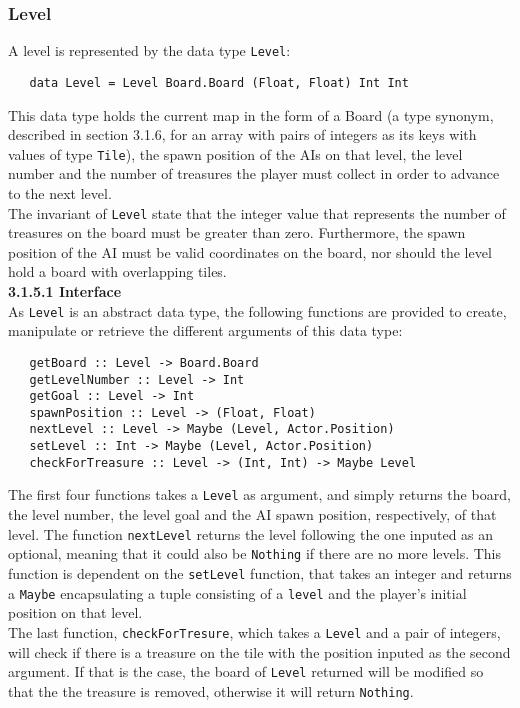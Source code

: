 \documentclass{article}
\begin{document}
        \subsubsection{Level}
        A level is represented by the data type \texttt{Level}: \\
   \begin{verbatim}
   data Level = Level Board.Board (Float, Float) Int Int
   \end{verbatim}
        \noindent This data type holds the current map in the form of a Board (a type synonym, described in section 3.1.6, for an array with pairs of integers as its keys with values of type \texttt{Tile}), the spawn position of the AIs on that level, the level number and the number of treasures the player must collect in order to advance to the next level. \\
        \newline
        The invariant of \texttt{Level} state that the integer value that represents the number of treasures on the board must be greater than zero. Furthermore, the spawn position of the AI must be valid coordinates on the board, nor should the level hold a board with overlapping tiles. \\
        \newline
        \textbf{3.1.5.1 Interface}\\
        \newline
        As \texttt{Level} is an abstract data type, the following functions are provided to create, manipulate or retrieve the different arguments of this data type: \\

   \begin{verbatim}
   getBoard :: Level -> Board.Board
   getLevelNumber :: Level -> Int
   getGoal :: Level -> Int
   spawnPosition :: Level -> (Float, Float)
   nextLevel :: Level -> Maybe (Level, Actor.Position)
   setLevel :: Int -> Maybe (Level, Actor.Position)
   checkForTreasure :: Level -> (Int, Int) -> Maybe Level
   \end{verbatim}
        \noindent The first four functions takes a \texttt{Level} as argument, and simply returns the board, the level number, the level goal and the AI spawn position, respectively, of that level. The function \texttt{nextLevel} returns the level following the one inputed as an optional, meaning that it could also be \texttt{Nothing} if there are no more levels. This function is dependent on the \texttt{setLevel} function, that takes an integer and returns a \texttt{Maybe} encapsulating a tuple consisting of a \texttt{level} and the player's initial position on that level. \\
        \newline
        The last function, \texttt{checkForTresure}, which takes a \texttt{Level} and a pair of integers, will check if there is a treasure on the tile with the position inputed as the second argument. If that is the case, the board of \texttt{Level} returned will be modified so that the the treasure is removed, otherwise it will return \texttt{Nothing}.
\end{document}
